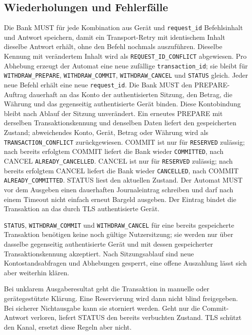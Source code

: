 \documentclass[a4paper,11pt]{article}
\newif\ifexplain
\newcommand{\explain}[1]{\ifexplain\begin{erklbox}#1\end{erklbox}\fi}
\begin{document}
\explain{Reservieren verhindert, dass zwei Automaten denselben verfügbaren Betrag gleichzeitig ausgeben. Die eigentliche Bargeldausgabe ist aber kein Datenbankbefehl. Deshalb braucht der Ablauf einen dauerhaften Gerätezustand und eine Klärung bei einem Abbruch.}
\subsection*{Wiederholungen und Fehlerfälle}
Die Bank MUST für jede Kombination aus Gerät und \texttt{request\_id} Befehlsinhalt und Antwort speichern, damit ein Transport-Retry mit identischem Inhalt dieselbe Antwort erhält, ohne den Befehl nochmals auszuführen. Dieselbe Kennung mit verändertem Inhalt wird als \texttt{REQUEST\_ID\_CONFLICT} abgewiesen. Pro Abhebung erzeugt der Automat eine neue zufällige \texttt{transaction\_id}; sie bleibt für \texttt{WITHDRAW\_PREPARE}, \texttt{WITHDRAW\_COMMIT}, \texttt{WITHDRAW\_CANCEL} und \texttt{STATUS} gleich. Jeder neue Befehl erhält eine neue \texttt{request\_id}. Die Bank MUST den PREPARE-Auftrag dauerhaft an das Konto der authentisierten Sitzung, den Betrag, die Währung und das gegenseitig authentisierte Gerät binden. Diese Kontobindung bleibt nach Ablauf der Sitzung unverändert. Ein erneutes PREPARE mit derselben Transaktionskennung und denselben Daten liefert den gespeicherten Zustand; abweichendes Konto, Gerät, Betrag oder Währung wird als \texttt{TRANSACTION\_CONFLICT} zurückgewiesen. COMMIT ist nur für \texttt{RESERVED} zulässig; nach bereits erfolgtem COMMIT liefert die Bank wieder \texttt{COMMITTED}, nach CANCEL \texttt{ALREADY\_CANCELLED}. CANCEL ist nur für \texttt{RESERVED} zulässig; nach bereits erfolgtem CANCEL liefert die Bank wieder \texttt{CANCELLED}, nach COMMIT \texttt{ALREADY\_COMMITTED}. STATUS liest den aktuellen Zustand. Der Automat MUST vor dem Ausgeben einen dauerhaften Journaleintrag schreiben und darf nach einem Timeout nicht einfach erneut Bargeld ausgeben. Der Eintrag bindet die Transaktion an das durch TLS authentisierte Gerät.

\texttt{STATUS}, \texttt{WITHDRAW\_COMMIT} und \texttt{WITHDRAW\_CANCEL} für eine bereits gespeicherte Transaktion benötigen keine noch gültige Nutzersitzung; sie werden nur über dasselbe gegenseitig authentisierte Gerät und mit dessen gespeicherter Transaktionskennung akzeptiert. Nach Sitzungsablauf sind neue Kontostandsabfragen und Abhebungen gesperrt, eine offene Auszahlung lässt sich aber weiterhin klären.

Bei unklarem Ausgaberesultat geht die Transaktion in manuelle oder gerätegestützte Klärung. Eine Reservierung wird dann nicht blind freigegeben. Bei sicherer Nichtausgabe kann sie storniert werden. Geht nur die Commit-Antwort verloren, liefert STATUS den bereits verbuchten Zustand. TLS schützt den Kanal, ersetzt diese Regeln aber nicht.
\end{document}
